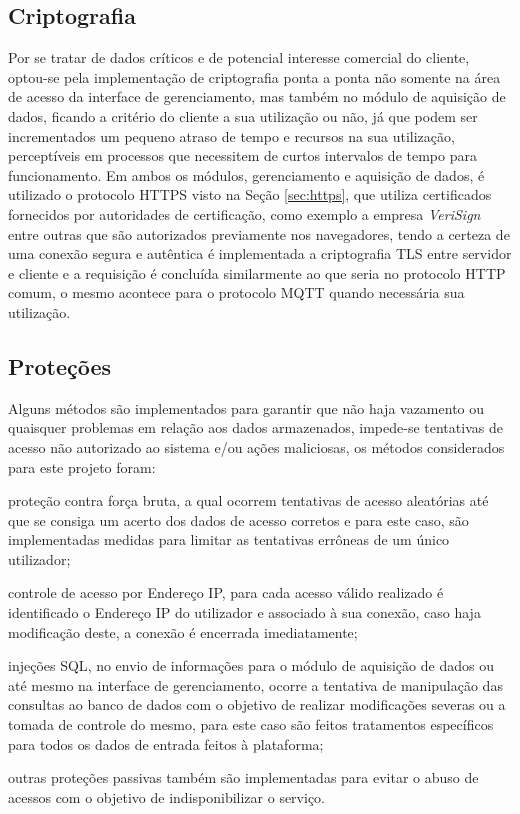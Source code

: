         \subsection{Criptografia}
        \label{sec:criptografia}
        Por se tratar de dados críticos e de potencial interesse comercial do cliente, optou-se pela implementação de criptografia ponta a ponta não somente na área de acesso da interface de gerenciamento, mas também no módulo de aquisição de dados, ficando a critério do cliente a sua utilização ou não, já que podem ser incrementados um pequeno atraso de tempo e recursos na sua utilização, perceptíveis em processos que necessitem de curtos intervalos de tempo para funcionamento.  Em ambos os módulos, gerenciamento e aquisição de dados, é utilizado o protocolo \gls{HTTPS} visto na Seção \ref{sec:https}, que utiliza certificados fornecidos por autoridades de certificação, como exemplo a empresa \textit{VeriSign} entre outras que são autorizados previamente nos navegadores, tendo a certeza de uma conexão segura e autêntica é implementada a criptografia \gls{TLS} entre servidor e cliente e a requisição é concluída similarmente ao que seria no protocolo \gls{HTTP} comum, o mesmo acontece para o protocolo \gls{MQTT} quando necessária sua utilização.
        
        \subsection{Proteções}
        \label{sec:protecoes}
        
        Alguns métodos são implementados para garantir que não haja vazamento ou quaisquer problemas em relação aos dados armazenados, impede-se tentativas de acesso não autorizado ao sistema e/ou ações maliciosas, os métodos considerados para este projeto foram:
        
        \begin{alineascomponto}
            \item proteção contra força bruta, a qual ocorrem tentativas de acesso aleatórias até que se consiga um acerto dos dados de acesso corretos e para este caso, são implementadas medidas para limitar as tentativas errôneas de um único utilizador;
            \item controle de acesso por Endereço IP, para cada acesso válido realizado é identificado o Endereço IP do utilizador e associado à sua conexão, caso haja modificação deste, a conexão é encerrada imediatamente;
            \item injeções \gls{SQL}, no envio de informações para o módulo de aquisição de dados ou até mesmo na interface de gerenciamento, ocorre a tentativa de manipulação das consultas ao banco de dados com o objetivo de realizar modificações severas ou a tomada de controle do mesmo, para este caso são feitos tratamentos específicos para todos os dados de entrada feitos à plataforma;
            \item outras proteções passivas também são implementadas para evitar o abuso de acessos com o objetivo de indisponibilizar o serviço.
        \end{alineascomponto}

